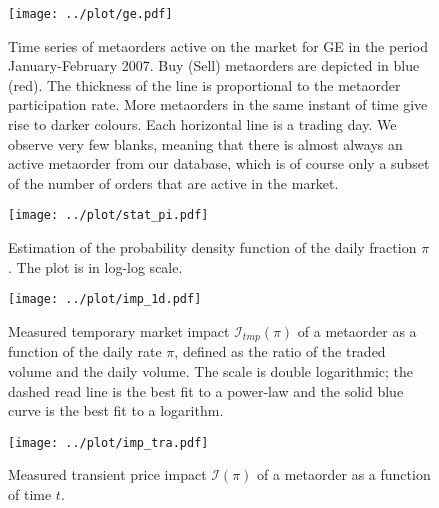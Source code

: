 \documentclass[12pt]{article}
\begin{document}
\begin{figure}[t] 
  \centering
 	\texttt{[image: ../plot/ge.pdf]}
  \caption{Time series of metaorders active on the market for GE in the period January-February 2007. Buy (Sell) metaorders are depicted in blue (red). The thickness of the line is proportional to the metaorder participation rate. More metaorders in the same instant of time give rise to darker colours. Each horizontal line is a trading day. We observe very few blanks, meaning that there is almost always an active metaorder from our database, which is of course only a subset of the number of orders that are active in the market.}
  \label{fig_ge}
\end{figure}

\begin{figure}[t] 
  \centering
 	\texttt{[image: ../plot/stat\_pi.pdf]}
  \caption{Estimation of the probability density function of the daily fraction $\pi$. The plot is in log-log scale.}
  \label{fig_stat}
\end{figure}

\begin{figure}[t] 
  \centering
 	\texttt{[image: ../plot/imp\_1d.pdf]}
  \caption{Measured temporary market impact $\mathcal{I}_{tmp}(\pi )$ of a metaorder as a function of the daily rate $\pi$, defined as the ratio of the traded volume and the daily volume. The scale is double logarithmic; the dashed read line is the best fit to a power-law and the solid blue curve is the best fit to a logarithm.}
  \label{fig_imp_tmp}
\end{figure}


\begin{figure}[t] 
  \centering
 	\texttt{[image: ../plot/imp\_tra.pdf]}
  \caption{Measured transient price impact $\mathcal{I}(\pi )$ of a metaorder as a function of time $t$. }
  \label{fig_imp_tra}
\end{figure}
\end{document}

